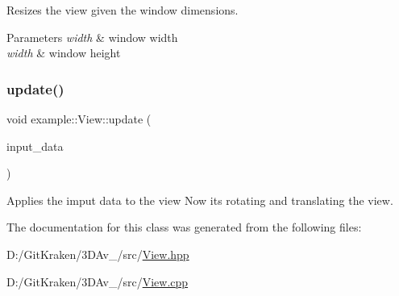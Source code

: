 Resizes the view given the window dimensions. 


\begin{DoxyParams}{Parameters}
{\em width} & window width \\
\hline
{\em width} & window height \\
\hline
\end{DoxyParams}
\mbox{\label{classoglsl_1_1_view_ac0b18fc4d2abe1abca6940c55313ef3b}} 
\subsubsection{\texorpdfstring{update()}{update()}}
{\footnotesize\ttfamily void example\+::\+View\+::update (\begin{DoxyParamCaption}\item[{\mbox{\hyperlink{classoglsl_1_1_input_a3b21d7328538e661f366af5d6059c197}{Input\+::\+Input\+Data}}}]{input\+\_\+data }\end{DoxyParamCaption})}



Applies the imput data to the view Now it\textquotesingle{}s rotating and translating the view. 



The documentation for this class was generated from the following files\+:\begin{DoxyCompactItemize}
\item 
D\+:/\+Git\+Kraken/3\+D\+Av\+\_/src/\mbox{\hyperlink{_view_8hpp}{View.\+hpp}}\item 
D\+:/\+Git\+Kraken/3\+D\+Av\+\_/src/\mbox{\hyperlink{_view_8cpp}{View.\+cpp}}\end{DoxyCompactItemize}
